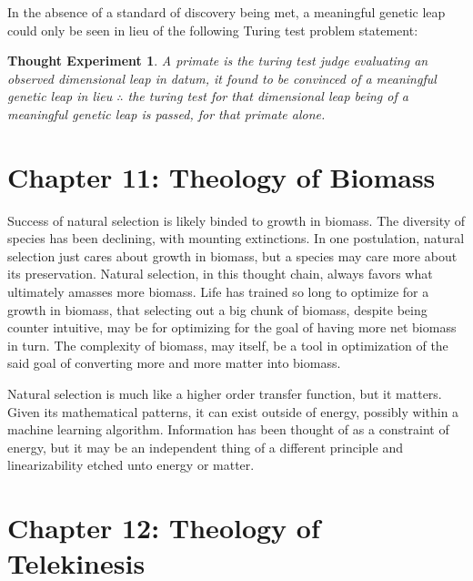 \documentclass[ebook,12pt,oneside,openany]{memoir}
\newtheorem*{thoughtexperiment}{Thought Experiment} %
\begin{document}
\indent In the absence of a standard of discovery being met, a meaningful genetic leap could only be seen in lieu of the following Turing test problem statement:

\indent \begin{thoughtexperiment}
A primate is the turing test judge evaluating an observed dimensional leap in datum, it found to be convinced of a meaningful genetic leap in lieu $\therefore$ the turing test for that dimensional leap being of a meaningful genetic leap is passed, for that primate alone.
\end{thoughtexperiment}
\chapter*{Chapter 11: Theology of Biomass}


\indent \indent Success of natural selection is likely binded to growth in biomass. The diversity of species has been declining, with mounting extinctions. In one postulation, natural selection just cares about growth in biomass, but a species may care more about its preservation. Natural selection, in this thought chain, always favors what ultimately amasses more biomass. Life has trained so long to optimize for a growth in biomass, that selecting out a big chunk of biomass, despite being counter intuitive, may be for optimizing for the goal of having more net biomass in turn. The complexity of biomass, may itself, be a tool in optimization of the said goal of converting more and more matter into biomass.

\indent Natural selection is much like a higher order transfer function, but it matters. Given its mathematical patterns, it can exist outside of energy, possibly within a machine learning algorithm. Information has been thought of as a constraint of energy, but it may be an independent thing of a different principle and linearizability etched unto energy or matter.
\chapter*{Chapter 12: Theology of Telekinesis}


\vspace*{\fill} %


\vspace*{\fill} %
\end{document}
